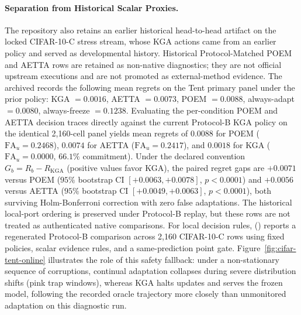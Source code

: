 \paragraph{Separation from Historical Scalar Proxies.}
The repository also retains an earlier historical head-to-head artifact on the locked CIFAR-10-C stress stream,
whose KGA actions came from an earlier policy and served as developmental history.
Historical Protocol-Matched POEM and AETTA rows are retained as non-native diagnostics; they are not official upstream executions and are
 not promoted as external-method evidence. The archived  records the following mean regrets on the Tent primary panel under the prior policy: KGA $= 0.0016$, AETTA $= 0.0073$, POEM $= 0.0088$, always-adapt $= 0.0080$, always-freeze $= 0.1238$. Evaluating the per-condition POEM and AETTA decision traces directly against the current Protocol-B KGA policy on the identical 2,160-cell panel yields mean regrets of $0.0088$ for POEM ($\mathrm{FA}_u = 0.2468$), $0.0074$ for AETTA ($\mathrm{FA}_u = 0.2417$), and $0.0018$ for KGA ($\mathrm{FA}_u = 0.0000$, $66.1\%$ commitment). Under the declared convention $G_b = R_b - R_{\mathrm{KGA}}$ (positive values favor KGA), the paired regret gaps are $+0.0071$ versus POEM ($95\%$ bootstrap CI $[+0.0063, +0.0078]$, $p < 0.0001$) and $+0.0056$ versus AETTA ($95\%$ bootstrap CI $[+0.0049, +0.0063]$, $p < 0.0001$), both surviving Holm-Bonferroni correction with zero false adaptations. The historical local-port ordering is preserved under Protocol-B replay, but these rows are not treated as authenticated native comparisons. For local decision rules, 
() reports a regenerated
Protocol-B comparison across 2,160 CIFAR-10-C rows using fixed policies, scalar evidence rules, and a
same-prediction point gate.
Figure~\ref{fig:cifar-tent-online} illustrates the role of this safety fallback: under a non-stationary sequence of corruptions, continual adaptation collapses during severe distribution shifts (pink trap windows), whereas KGA halts updates and serves the frozen model, following the recorded oracle trajectory more closely than unmonitored adaptation on this diagnostic run.

